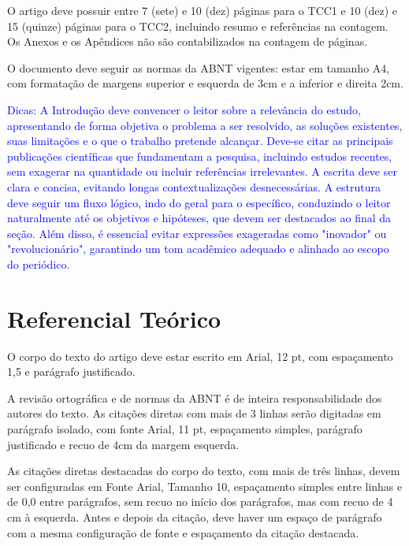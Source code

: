 \documentclass[
	article,			%
	11pt,				%
	oneside,			%
	a4paper,			%
	english,			%
	brazil,				%
	sumario=tradicional
]{abntex2}
\begin{document}
O artigo deve possuir entre 7 (sete) e 10 (dez) páginas para o TCC1 e 10
(dez) e 15 (quinze) páginas para o TCC2, incluindo resumo e referências na
contagem. Os Anexos e os Apêndices não são contabilizados na contagem de
páginas.

O documento deve seguir as normas da ABNT vigentes: estar em tamanho A4, com
formatação de margens superior e esquerda de 3cm e a inferior e direita 2cm.

\textcolor{blue}{
Dicas: A Introdução deve convencer o leitor sobre a relevância do estudo,
apresentando de forma objetiva o problema a ser resolvido, as soluções
existentes, suas limitações e o que o trabalho pretende alcançar. Deve-se citar
as principais publicações científicas que fundamentam a pesquisa, incluindo
estudos recentes, sem exagerar na quantidade ou incluir referências
irrelevantes. A escrita deve ser clara e concisa, evitando longas
contextualizações desnecessárias. A estrutura deve seguir um fluxo lógico, indo
do geral para o específico, conduzindo o leitor naturalmente até os objetivos e
hipóteses, que devem ser destacados ao final da seção. Além disso, é essencial
evitar expressões exageradas como "inovador" ou "revolucionário", garantindo um
tom acadêmico adequado e alinhado ao escopo do periódico.
}

\section{Referencial Teórico}

O corpo do texto do artigo deve estar escrito em Arial, 12 pt, com espaçamento
1,5 e parágrafo justificado.

A revisão ortográfica e de normas da ABNT é de inteira responsabilidade dos
autores do texto. As citações diretas com mais de 3 linhas serão digitadas em
parágrafo isolado, com fonte Arial, 11 pt, espaçamento simples, parágrafo
justificado e recuo de 4cm da margem esquerda.

\begin{flushright}
    \begin{minipage}{0.8\textwidth}
\fontsize{10}{12}\selectfont
As citações diretas destacadas do corpo do texto, com mais de três linhas,
devem ser configuradas em Fonte Arial, Tamanho 10, espaçamento simples entre
linhas e de 0,0 entre parágrafos, sem recuo no início dos parágrafos, mas com
recuo de 4 cm à esquerda. Antes e depois da citação, deve haver um espaço de
parágrafo com a mesma configuração de fonte e espaçamento da citação destacada.
    \end{minipage}
\end{flushright}
\end{document}
